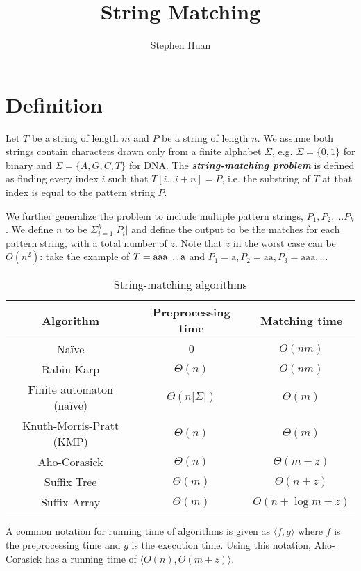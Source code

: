 \documentclass[11pt, oneside]{article}
\title{String Matching}
\author{Stephen Huan}
\begin{document}
\maketitle

\section{Definition}
Let \( T \) be a string of length \( m \) and \( P \) be a string of length \( n \).
We assume both strings contain characters drawn only from a finite alphabet \( \Sigma \),
e.g. \( \Sigma = \{ 0, 1 \} \) for binary and \( \Sigma = \{ A, G, C, T \} \) for DNA.
The \textbf{\textit{string-matching problem}} is defined as finding every index \( i \)
such that \( T[i \dots i + n] = P \), i.e. the substring of \( T \) at that index is
equal to the pattern string \( P \).

We further generalize the problem to include multiple pattern strings, \( P_1, P_2, ... P_k \). We define \( n \) to be \( \Sigma^{k}_{i = 1} |P_i| \) and define the output to be the matches for each pattern string, with a total number of \( z \). Note that \( z \) in the worst case can be
\( O(n^2) \): take the example of \( T = \text{aaa\dots a} \) and \( P_1 = \text{a}, P_2 = \text{aa}, P_3 = \text{aaa}, \dots \)

\begin{table}[h!]
\centering
\begin{tabular}{ ccc }
 Algorithm & Preprocessing time & Matching time \\
 \hline
 Naïve & \( 0 \) & \( O(nm) \) \\
 Rabin-Karp & \( \Theta(n) \) & \( O(nm) \) \\
 Finite automaton (naïve) & \( \Theta(n|\Sigma|) \) & \( \Theta(m) \) \\
 Knuth-Morris-Pratt (KMP) & \( \Theta(n) \) & \( \Theta(m) \) \\
 Aho-Corasick & \( \Theta(n) \) & \( \Theta(m + z) \) \\
 Suffix Tree & \( \Theta(m) \) & \( \Theta(n + z) \) \\
 Suffix Array & \( \Theta(m) \) & \( O(n + \log m + z) \) \\
 \hline
\end{tabular}
\caption{String-matching algorithms}
\end{table}

A common notation for running time of algorithms is given as \( \langle f, g \rangle \)
where \( f \) is the preprocessing time and \( g \) is the execution time. Using
this notation, Aho-Corasick has a running time of \( \langle O(n), O(m + z) \rangle \).
\end{document}
